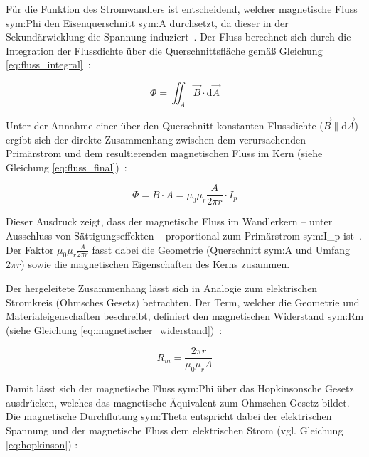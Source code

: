 Für die Funktion des Stromwandlers ist entscheidend, welcher magnetische Fluss \gls{sym:Phi} den Eisenquerschnitt \gls{sym:A} durchsetzt, da dieser in der Sekundärwicklung die Spannung induziert~\cite[S.~67]{book-Technologie_Messwandler-Minkner}. Der Fluss berechnet sich durch die Integration der Flussdichte über die Querschnittsfläche gemäß Gleichung \eqref{eq:fluss_integral}~\cite[Kap.~4.5.4]{book-Physik_Ingenieure-Hering}:

\begin{equation}
    \Phi = \iint_A \vec{B} \cdot \mathrm{d}\vec{A}
    \label{eq:fluss_integral}
\end{equation}



Unter der Annahme einer über den Querschnitt konstanten Flussdichte ($\vec{B} \parallel \mathrm{d}\vec{A}$) ergibt sich der direkte Zusammenhang zwischen dem verursachenden Primärstrom und dem resultierenden magnetischen Fluss im Kern (siehe Gleichung \eqref{eq:fluss_final})~\cite[Kap.~4.5.4]{book-Physik_Ingenieure-Hering}:

\begin{equation}
    \Phi = B \cdot A = \mu_0 \mu_r \frac{A}{2\pi r} \cdot I_{p}
    \label{eq:fluss_final}
\end{equation}

Dieser Ausdruck zeigt, dass der magnetische Fluss im Wandlerkern – unter Ausschluss von Sättigungseffekten – proportional zum Primärstrom \gls{sym:I_p} ist~\cite[Kap.~11]{book-Magnetisches_Feld_Moeller-Harriehausen}. Der Faktor $\mu_0 \mu_r \frac{A}{2\pi r}$ fasst dabei die Geometrie (Querschnitt \gls{sym:A} und Umfang $2\pi r$) sowie die magnetischen Eigenschaften des Kerns zusammen.

Der hergeleitete Zusammenhang lässt sich in Analogie zum elektrischen Stromkreis (Ohmsches Gesetz) betrachten. Der Term, welcher die Geometrie und Materialeigenschaften beschreibt, definiert den magnetischen Widerstand \gls{sym:Rm} (siehe Gleichung \eqref{eq:magnetischer_widerstand})~\cite[Kap.~11.9]{book-Magnetisches_Feld_Moeller-Harriehausen}:

\begin{equation}
    R_m = \frac{2\pi r}{\mu_0 \mu_r A}
    \label{eq:magnetischer_widerstand}
\end{equation}

Damit lässt sich der magnetische Fluss \gls{sym:Phi} über das Hopkinsonsche Gesetz ausdrücken, welches das magnetische Äquivalent zum Ohmschen Gesetz bildet. Die magnetische Durchflutung \gls{sym:Theta} entspricht dabei der elektrischen Spannung und der magnetische Fluss dem elektrischen Strom (vgl. Gleichung \eqref{eq:hopkinson}) \cite[Kap.~11.9]{book-Magnetisches_Feld_Moeller-Harriehausen}:

